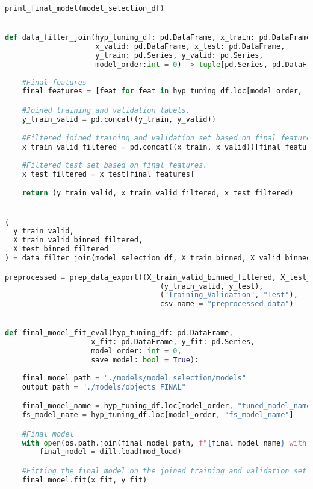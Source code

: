 \begin{lstlisting}[language=Python, basicstyle=\footnotesize\ttfamily]
print_final_model(model_selection_df)


def data_filter_join(hyp_tuning_df: pd.DataFrame, x_train: pd.DataFrame,
                     x_valid: pd.DataFrame, x_test: pd.DataFrame,
                     y_train: pd.Series, y_valid: pd.Series,
                     model_order:int = 0) -> tuple[pd.Series, pd.DataFrame, pd.DataFrame]:
    
    #Final features
    final_features = [feat for feat in hyp_tuning_df.loc[model_order, "final_features"]]

    #Joined training and validation labels.
    y_train_valid = pd.concat((y_train, y_valid))

    #Filtered joined training and validation set based on final features.
    x_train_valid_filtered = pd.concat((x_train, x_valid))[final_features]
    
    #Filtered test set based on final features.
    x_test_filtered = x_test[final_features]

    return (y_train_valid, x_train_valid_filtered, x_test_filtered)


(
  y_train_valid,
  X_train_valid_binned_filtered,
  X_test_binned_filtered
) = data_filter_join(model_selection_df, X_train_binned, X_valid_binned, X_test_binned, y_train, y_valid)

preprocessed = prep_data_export((X_train_valid_binned_filtered, X_test_binned_filtered),
                                    (y_train_valid, y_test),
                                    ("Training_Validation", "Test"),
                                    csv_name = "preprocessed_data")


def final_model_fit_eval(hyp_tuning_df: pd.DataFrame,
                    x_fit: pd.DataFrame, y_fit: pd.Series,
                    model_order: int = 0,
                    save_model: bool = True):
  
    final_model_path = "./models/model_selection/models"
    output_path = "./models/objects_FINAL"

    final_model_name = hyp_tuning_df.loc[model_order, "tuned_model_name"]
    fs_model_name = hyp_tuning_df.loc[model_order, "fs_model_name"]

    #Final model
    with open(os.path.join(final_model_path, f"{final_model_name}_with_{fs_model_name}.h5"), "rb") as mod_load:
        final_model = dill.load(mod_load)

    #Fitting the final model on the joined training and validation set
    final_model.fit(x_fit, y_fit)
    

\end{lstlisting}
